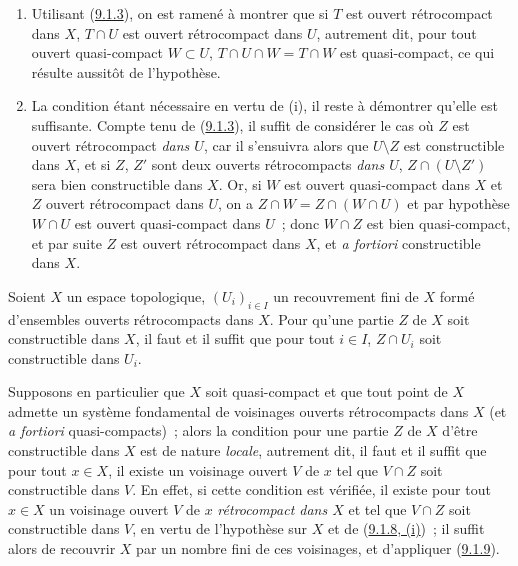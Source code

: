 \begin{enumerate}
  \item[(i)] Utilisant (\hyperref[0.9.1.3-fr]{9.1.3}), on est ramené à
    montrer que si $T$ est ouvert rétrocompact dans $X$, $T\cap U$ est ouvert
    rétrocompact dans $U$, autrement dit, pour tout ouvert quasi-compact
    $W\subset U$, $T\cap U\cap W=T\cap W$ est quasi-compact, ce qui résulte
    aussitôt de l'hypothèse.
  \item[(ii)] La condition étant nécessaire en vertu de (i), il reste à
    démontrer qu'elle est suffisante. Compte tenu de
    (\hyperref[0.9.1.3-fr]{9.1.3}), il suffit de considérer le cas où $Z$ est
    ouvert rétrocompact \emph{dans $U$}, car il s'ensuivra alors que
    $U\setminus Z$ est constructible dans $X$, et si $Z$, $Z'$ sont deux
    ouverts rétrocompacts \emph{dans $U$},
    $Z\cap(U\setminus Z')$ sera bien constructible dans $X$. Or, si $W$ est
    ouvert quasi-compact dans $X$ et $Z$ ouvert rétrocompact dans $U$, on a
    $Z\cap W=Z\cap(W\cap U)$ et par hypothèse $W\cap U$ est ouvert
    quasi-compact dans $U$~; donc $W\cap Z$ est bien quasi-compact, et par
    suite $Z$ est ouvert rétrocompact dans $X$, et \emph{a fortiori}
    constructible dans $X$.
\end{enumerate}

\begin{corollary}[9.1.9]
\label{0.9.1.9-fr}
Soient $X$ un espace topologique, $(U_i)_{i\in I}$ un recouvrement fini de
$X$ formé d'ensembles ouverts rétrocompacts dans $X$. Pour qu'une partie $Z$
de $X$ soit constructible dans $X$, il faut et il suffit que pour tout
$i\in I$, $Z\cap U_i$ soit constructible dans $U_i$.
\end{corollary}

\begin{env}[9.1.10]
\label{0.9.1.10-fr}
Supposons en particulier que $X$ soit quasi-compact et que tout point
de $X$ admette un système fondamental de voisinages ouverts rétrocompacts
dans $X$ (et \emph{a fortiori} quasi-compacts)~; alors la condition pour une
partie $Z$ de $X$ d'être constructible dans $X$ est de nature \emph{locale},
autrement dit, il faut et il suffit que pour tout $x\in X$, il existe un
voisinage ouvert $V$ de $x$ tel que $V\cap Z$ soit constructible dans $V$. En
effet, si cette condition est vérifiée, il existe pour tout $x\in X$ un
voisinage ouvert $V$ de $x$ \emph{rétrocompact dans $X$} et tel que
$V\cap Z$ soit constructible dans $V$, en vertu de l'hypothèse sur $X$ et de
(\hyperref[0.9.1.8-fr]{9.1.8, (i)})~; il suffit alors de recouvrir $X$ par un
nombre fini de ces voisinages, et d'appliquer
(\hyperref[0.9.1.9-fr]{9.1.9}).
\end{env}

